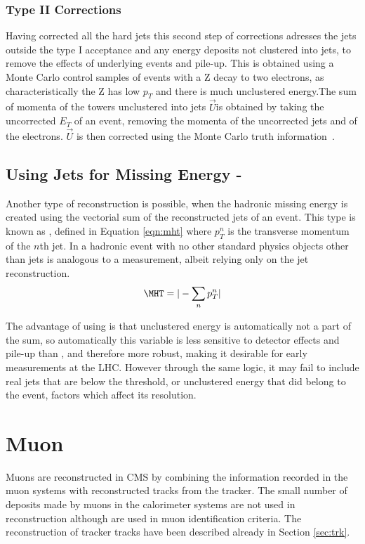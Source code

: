 \subsubsection{Type II Corrections}

Having corrected all the hard jets this second step of corrections adresses the jets outside the type I acceptance and any energy deposits not clustered into jets, to remove the effects of underlying events and pile-up. This is obtained using a Monte Carlo control samples of events with a Z decay to two electrons, as characteristically the Z has low $p_{T}$ and there is much unclustered energy.The sum of momenta of the towers unclustered into jets $\vec{U}$is obtained by taking the uncorrected $E_{T}$ of an event, removing the momenta of the uncorrected jets and of the electrons. $\vec{U}$ is then corrected using the Monte Carlo truth information~\cite{JME-10-004}. 


\subsection{Using Jets for Missing Energy - \MHT}

Another type of \met reconstruction is possible, when the hadronic missing energy is created using the vectorial sum of the reconstructed jets of an event. This type is known as \MHT, defined in Equation \ref{eqn:mht} where $p_{T}^{n}$ is the transverse momentum of the $n$th jet.  In a hadronic event with no other standard physics objects other than jets is analogous to a \met measurement, albeit relying only on the jet reconstruction. 
\begin{equation}
\MHT = | - \sum_{n} p_{T}^{n}|
\label{eqn:mht}
\end{equation}

The advantage of using \MHT is that unclustered energy is automatically not a part of the sum, so automatically this variable is less sensitive to detector effects and pile-up than \met, and therefore more robust, making it desirable for early measurements at the LHC. However through the same logic, it may fail to include real jets that are below the threshold, or unclustered energy that did belong to the event, factors which affect its resolution. 

\section{Muon}
\label{sec:muona}
Muons are reconstructed in CMS by combining the information recorded in the muon systems with reconstructed tracks from the tracker. The small number of deposits made by muons in the calorimeter systems are not used in reconstruction although are used in muon identification criteria. The reconstruction of tracker tracks have been described already in Section  \ref{sec:trk}. 


